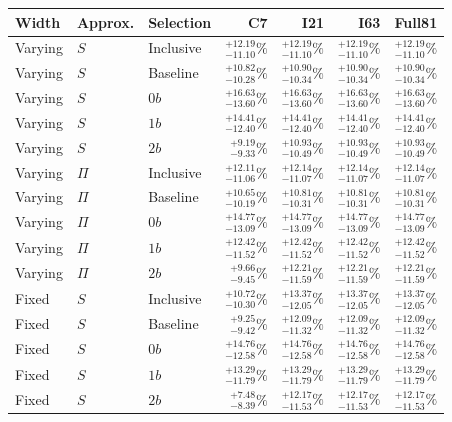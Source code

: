 \begin{tabular}{lllrrrr}
\toprule
Width & Approx. & Selection & C7 & I21 & I63 & Full81 \\
\midrule
Varying & $S$ & Inclusive & $^{+12.19}_{-11.10}\%$ & $^{+12.19}_{-11.10}\%$ & $^{+12.19}_{-11.10}\%$ & $^{+12.19}_{-11.10}\%$ \\
Varying & $S$ & Baseline & $^{+10.82}_{-10.28}\%$ & $^{+10.90}_{-10.34}\%$ & $^{+10.90}_{-10.34}\%$ & $^{+10.90}_{-10.34}\%$ \\
Varying & $S$ & $0b$ & $^{+16.63}_{-13.60}\%$ & $^{+16.63}_{-13.60}\%$ & $^{+16.63}_{-13.60}\%$ & $^{+16.63}_{-13.60}\%$ \\
Varying & $S$ & $1b$ & $^{+14.41}_{-12.40}\%$ & $^{+14.41}_{-12.40}\%$ & $^{+14.41}_{-12.40}\%$ & $^{+14.41}_{-12.40}\%$ \\
Varying & $S$ & $2b$ & $^{+9.19}_{-9.33}\%$ & $^{+10.93}_{-10.49}\%$ & $^{+10.93}_{-10.49}\%$ & $^{+10.93}_{-10.49}\%$ \\
Varying & $\Pi$ & Inclusive & $^{+12.11}_{-11.06}\%$ & $^{+12.14}_{-11.07}\%$ & $^{+12.14}_{-11.07}\%$ & $^{+12.14}_{-11.07}\%$ \\
Varying & $\Pi$ & Baseline & $^{+10.65}_{-10.19}\%$ & $^{+10.81}_{-10.31}\%$ & $^{+10.81}_{-10.31}\%$ & $^{+10.81}_{-10.31}\%$ \\
Varying & $\Pi$ & $0b$ & $^{+14.77}_{-13.09}\%$ & $^{+14.77}_{-13.09}\%$ & $^{+14.77}_{-13.09}\%$ & $^{+14.77}_{-13.09}\%$ \\
Varying & $\Pi$ & $1b$ & $^{+12.42}_{-11.52}\%$ & $^{+12.42}_{-11.52}\%$ & $^{+12.42}_{-11.52}\%$ & $^{+12.42}_{-11.52}\%$ \\
Varying & $\Pi$ & $2b$ & $^{+9.66}_{-9.45}\%$ & $^{+12.21}_{-11.59}\%$ & $^{+12.21}_{-11.59}\%$ & $^{+12.21}_{-11.59}\%$ \\
Fixed & $S$ & Inclusive & $^{+10.72}_{-10.30}\%$ & $^{+13.37}_{-12.05}\%$ & $^{+13.37}_{-12.05}\%$ & $^{+13.37}_{-12.05}\%$ \\
Fixed & $S$ & Baseline & $^{+9.25}_{-9.42}\%$ & $^{+12.09}_{-11.32}\%$ & $^{+12.09}_{-11.32}\%$ & $^{+12.09}_{-11.32}\%$ \\
Fixed & $S$ & $0b$ & $^{+14.76}_{-12.58}\%$ & $^{+14.76}_{-12.58}\%$ & $^{+14.76}_{-12.58}\%$ & $^{+14.76}_{-12.58}\%$ \\
Fixed & $S$ & $1b$ & $^{+13.29}_{-11.79}\%$ & $^{+13.29}_{-11.79}\%$ & $^{+13.29}_{-11.79}\%$ & $^{+13.29}_{-11.79}\%$ \\
Fixed & $S$ & $2b$ & $^{+7.48}_{-8.39}\%$ & $^{+12.17}_{-11.53}\%$ & $^{+12.17}_{-11.53}\%$ & $^{+12.17}_{-11.53}\%$ \\

\end{tabular}
